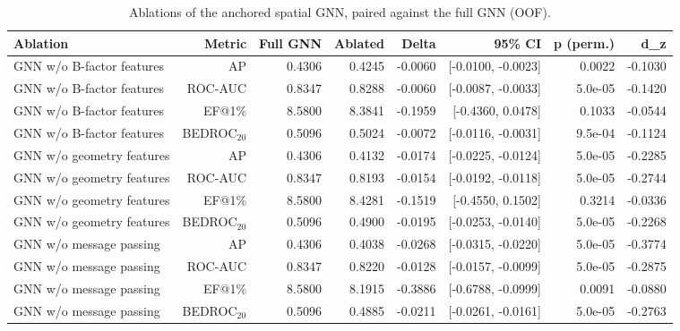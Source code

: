 \begin{table}[t]
\centering
\small
\caption{Ablations of the anchored spatial GNN, paired against the full GNN (OOF).}
\label{tab:table3b_gnn_ablations_oof}
\begin{tabular}{lrrrrrrr}
\toprule
Ablation & Metric & Full GNN & Ablated & Delta & 95\% CI & p (perm.) & d\_z \\
\midrule
GNN w/o B-factor features & AP & 0.4306 & 0.4245 & -0.0060 & [-0.0100, -0.0023] & 0.0022 & -0.1030 \\
GNN w/o B-factor features & ROC-AUC & 0.8347 & 0.8288 & -0.0060 & [-0.0087, -0.0033] & 5.0e-05 & -0.1420 \\
GNN w/o B-factor features & EF@1\% & 8.5800 & 8.3841 & -0.1959 & [-0.4360, 0.0478] & 0.1033 & -0.0544 \\
GNN w/o B-factor features & BEDROC$_{20}$ & 0.5096 & 0.5024 & -0.0072 & [-0.0116, -0.0031] & 9.5e-04 & -0.1124 \\
GNN w/o geometry features & AP & 0.4306 & 0.4132 & -0.0174 & [-0.0225, -0.0124] & 5.0e-05 & -0.2285 \\
GNN w/o geometry features & ROC-AUC & 0.8347 & 0.8193 & -0.0154 & [-0.0192, -0.0118] & 5.0e-05 & -0.2744 \\
GNN w/o geometry features & EF@1\% & 8.5800 & 8.4281 & -0.1519 & [-0.4550, 0.1502] & 0.3214 & -0.0336 \\
GNN w/o geometry features & BEDROC$_{20}$ & 0.5096 & 0.4900 & -0.0195 & [-0.0253, -0.0140] & 5.0e-05 & -0.2268 \\
GNN w/o message passing & AP & 0.4306 & 0.4038 & -0.0268 & [-0.0315, -0.0220] & 5.0e-05 & -0.3774 \\
GNN w/o message passing & ROC-AUC & 0.8347 & 0.8220 & -0.0128 & [-0.0157, -0.0099] & 5.0e-05 & -0.2875 \\
GNN w/o message passing & EF@1\% & 8.5800 & 8.1915 & -0.3886 & [-0.6788, -0.0999] & 0.0091 & -0.0880 \\
GNN w/o message passing & BEDROC$_{20}$ & 0.5096 & 0.4885 & -0.0211 & [-0.0261, -0.0161] & 5.0e-05 & -0.2763 \\
\bottomrule
\end{tabular}
\end{table}
